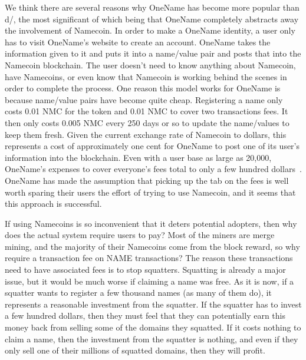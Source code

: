 We think there are several reasons why OneName has become more popular than d/, the most significant of which being that OneName completely abstracts away the involvement of Namecoin. In order to make a OneName identity, a user only has to visit OneName's website to create an account. OneName takes the information given to it and puts it into a name/value pair and posts that into the Namecoin blockchain. The user doesn't need to know anything about Namecoin, have Namecoins, or even know that Namecoin is working behind the scenes in order to complete the process. One reason this model works for OneName is because name/value pairs have become quite cheap. Registering a name only costs 0.01 NMC for the token and 0.01 NMC to cover two transactions fees. It then only costs 0.005 NMC every 250 days or so to update the name/values to keep them fresh. Given the current exchange rate of Namecoin to dollars, this represents a cost of approximately one cent for OneName to post one of its user's information into the blockchain. Even with a user base as large as 20,000, OneName's expenses to cover everyone's fees total to only a few hundred dollars~\cite{exchangerate}. OneName has made the assumption that picking up the tab on the fees is well worth sparing their users the effort of trying to use Namecoin, and it seems that this approach is successful.

If using Namecoins is so inconvenient that it deters potential adopters, then why does the actual system require users to pay? Most of the miners are merge mining, and the majority of their Namecoins come from the block reward, so why require a transaction fee on NAME transactions? The reason these transactions need to have associated fees is to stop squatters. Squatting is already a major issue, but it would be much worse if claiming a name was free. As it is now, if a squatter wants to register a few thousand names (as many of them do),  it represents a reasonable investment from the squatter. If the squatter has to invest a few hundred dollars, then they must feel that they can potentially earn this money back from selling some of the domains they squatted. If it costs nothing to claim a name, then the investment from the squatter is nothing, and even if they only sell one of their millions of squatted domains, then they will profit. 

